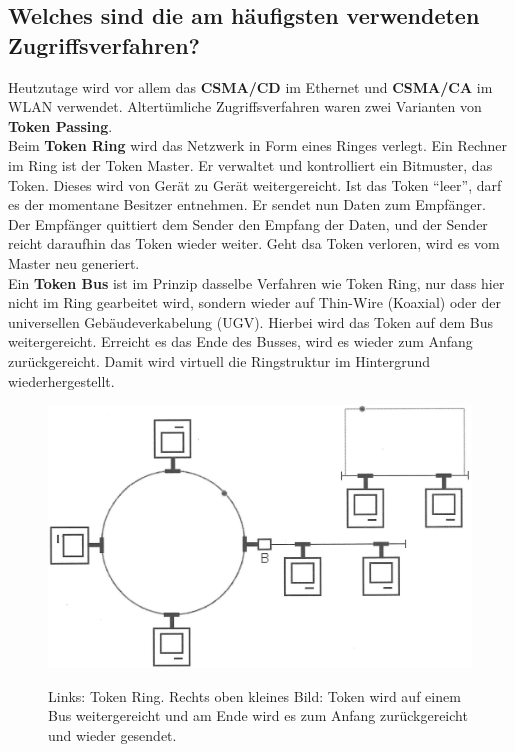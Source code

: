 \subsection*{Welches sind die am häufigsten verwendeten Zugriffsverfahren?}
Heutzutage wird vor allem das \textbf{CSMA/CD} im Ethernet und \textbf{CSMA/CA} im WLAN verwendet. Altertümliche Zugriffsverfahren waren zwei Varianten von \textbf{Token Passing}.\\[1em]
Beim \textbf{Token Ring} wird das Netzwerk in Form eines Ringes verlegt. Ein Rechner im Ring ist der Token Master. Er verwaltet und kontrolliert ein Bitmuster, das Token. Dieses wird von Gerät zu Gerät weitergereicht. Ist das Token "`leer"', darf es der momentane Besitzer entnehmen. Er sendet nun Daten zum Empfänger. Der Empfänger quittiert dem Sender den Empfang der Daten, und der Sender reicht daraufhin das Token wieder weiter. Geht dsa Token verloren, wird es vom Master neu generiert.\\[1em]
Ein \textbf{Token Bus} ist im Prinzip dasselbe Verfahren wie Token Ring, nur dass hier nicht im Ring gearbeitet wird, sondern wieder auf Thin-Wire (Koaxial) oder der universellen Gebäudeverkabelung (UGV). Hierbei wird das Token auf dem Bus weitergereicht. Erreicht es das Ende des Busses, wird es wieder zum Anfang zurückgereicht. Damit wird virtuell die Ringstruktur im Hintergrund wiederhergestellt\cite{Schreiner2019}.

\begin{figure}[H]
    \begin{center}
    \label{pic:Token}
    \includegraphics[width=\textwidth]{images/Token.jpg}
    \caption{Links: Token Ring. Rechts oben kleines Bild: Token wird auf einem Bus weitergereicht und am Ende wird es zum Anfang zurückgereicht und wieder gesendet.\cite{Schreiner2019}}
    \end{center}
\end{figure}

